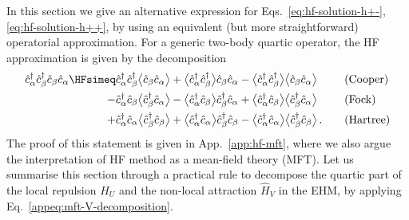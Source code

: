 In this section we give an alternative expression for Eqs.~\eqref{eq:hf-solution-h+-}, \eqref{eq:hf-solution-h++}, by using an equivalent (but more straightforward) operatorial approximation. For a generic two-body quartic operator, the HF approximation is given by the decomposition
\[
\begin{aligned}
	\hat c_\alpha^\dagger \hat c_\beta^\dagger \hat c_\beta \hat c_\alpha \HFsimeq &\hat c_\alpha^\dagger \hat c_\beta^\dagger \big\langle \hat c_\beta \hat c_\alpha \big\rangle + \big\langle \hat c_\alpha^\dagger \hat c_\beta^\dagger \big\rangle \hat c_\beta \hat c_\alpha - \big\langle \hat c_\alpha^\dagger \hat c_\beta^\dagger \big\rangle \big\langle \hat c_\beta \hat c_\alpha \big\rangle \quad&&(\text{Cooper})\\
	- &\hat c_\alpha^\dagger \hat c_\beta \big\langle \hat c_\beta^\dagger \hat c_\alpha \big\rangle - \big\langle \hat c_\alpha^\dagger \hat c_\beta \big\rangle \hat c_\beta^\dagger \hat c_\alpha + \big\langle \hat c_\alpha^\dagger \hat c_\beta \big\rangle \big\langle \hat c_\beta^\dagger \hat c_\alpha \big\rangle \quad&&(\text{Fock})\\
	+ &\hat c_\alpha^\dagger \hat c_\alpha \big\langle \hat c_\beta^\dagger \hat c_\beta \big\rangle + \big\langle \hat c_\alpha^\dagger \hat c_\alpha \big\rangle \hat c_\beta^\dagger \hat c_\beta - \big\langle \hat c_\alpha^\dagger \hat c_\alpha \big\rangle \big\langle \hat c_\beta^\dagger \hat c_\beta \big\rangle \, . \quad&&(\text{Hartree})
\end{aligned}
\]
The proof of this statement is given in App.~\ref{app:hf-mft}, where we also argue the interpretation of HF method as a mean-field theory (MFT). Let us summarise this section through a practical rule to decompose the quartic part of the local repulsion $\hat H_U$ and the non-local attraction $\hat H_V$ in the EHM, by applying Eq.~\eqref{appeq:mft-V-decomposition}.

